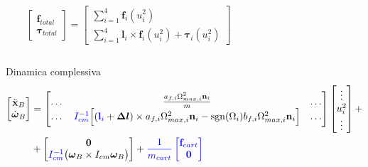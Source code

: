 \documentclass[]{beamer}
\DeclareMathOperator*{\sgn}{sgn}                %
\begin{document}
	\begin{frame}
		\centering
		\begin{columns}
			\begin{column}{.4\textwidth}
				\centering
				\begin{equation*}
				\begin{bmatrix}
					\mathbf{f}_{total} \\
					\boldsymbol{\tau}_{total}
				\end{bmatrix}
				=
				\begin{bmatrix}
					\sum\limits_{i=1}^{4} \mathbf{f}_i(u_i^2) \\
					\sum\limits_{i=1}^{4} \mathbf{l}_i \times \mathbf{f}_i(u_i^2) + \boldsymbol{\tau}_i(u_i^2)
				\end{bmatrix}
				\end{equation*}
			\end{column}
			\begin{column}{.4\textwidth}
				\centering
				\begin{figure}
					
				\end{figure}					
			\end{column}
		\end{columns}
		\begin{block}{Dinamica complessiva}
			\tiny
			\begin{equation*}
			\begin{split}
				\begin{bmatrix}
					\ddot{\mathbf{x}}_B \\
					\dot{\boldsymbol{\omega}}_B
				\end{bmatrix}
				&=
				\begin{bmatrix}
					\dots & \frac{a_{f,i}\Omega_{max,i}^2\mathbf{n}_i}{m} & \dots \\
					\dots & \textcolor{blue}{I_{cm}^{-1}}\Big[ (\textcolor{blue}{\mathbf{l}_i}+\boldsymbol{\Delta l})\times a_{f,i}\Omega^2_{max,i}\mathbf{n}_i-\sgn(\Omega_i)b_{f,i}\Omega_{max,i}^2\mathbf{n}_i\Big] & \dots
				\end{bmatrix}
				\begin{bmatrix}
					\vdots \\
					u_i^2 \\
					\vdots
				\end{bmatrix}
					+ \\
					&+
				\begin{bmatrix}
					\mathbf{0} \\
					\textcolor{blue}{I_{cm}^{-1}}\bigl(\boldsymbol{\omega}_B \times I_{cm} \boldsymbol{\omega}_B \bigl)
				\end{bmatrix}
				+
				\textcolor{blue}{
				\frac{1}{m_{cart}}
				\begin{bmatrix}
					\mathbf{f}_{cart} \\
					\mathbf{0}
				\end{bmatrix} 
				}
			\end{split}
			\end{equation*}
		\end{block}
	\end{frame}
\end{document}
